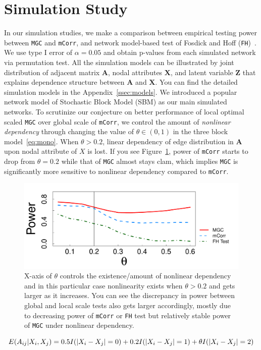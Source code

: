 \documentclass[11pt]{article}
\theoremstyle{definition}
\begin{document}
\section{Simulation Study}
\label{sec:simulation}
	\vspace*{-0.2cm}
In our simulation studies, we make a comparison between empirical testing power between \texttt{MGC} and \texttt{mCorr}, and network model-based test of Fosdick and Hoff (\texttt{FH})~\citep{fosdick2015testing}. We use type I error of $\alpha = 0.05$ and obtain p-values from each simulated network via permutation test. All the simulation models can be illustrated by joint distribution of adjacent matrix $\mathbf{A}$, nodal attributes $\mathbf{X}$, and latent variable $\mathbf{Z}$ that explains dependence structure between $\mathbf{A}$ and $\mathbf{X}$. You can find the detailed simulation models in the Appendix~\ref{ssec:models}. We introduced a popular network model of Stochastic Block Model (SBM) as our main simulated networks. To scrutinize our conjecture on better performance of local optimal scaled \texttt{MGC} over global scale of \texttt{mCorr}, we control the amount of \textit{nonlinear dependency} through changing the value of $\theta \in (0, 1)$ in the three block model~\ref{eq:mono}. When $\theta > 0.2$, linear dependency of edge distribution in $\mathbf{A}$ upon nodal attribute of $X$ is lost. If you see Figure~\ref{fig:powerplot}, power of \texttt{mCorr} starts to drop from $\theta = 0.2$ while that of \texttt{MGC} almost stays clam, which implies \texttt{MGC} is significantly more sensitive to nonlinear dependency compared to \texttt{mCorr}.  
\begin{figure}[ht]
	\centering
	\includegraphics[width=0.7\linewidth]{../Figure/mono_simple.pdf}
	\caption{X-axis of $\theta$ controls the existence/amount of nonlinear dependency and in this particular case nonlinearity exists when $\theta > 0.2$ and gets larger as it increases. You can see the discrepancy in power between global and local scale tests also gets larger accordingly, mostly due to decreasing power of \texttt{mCorr} or \texttt{FH} test but relatively stable power of \texttt{MGC} under nonlinear dependency.}
	\label{fig:powerplot}
\end{figure}
	\vspace*{-0.4cm}
\begin{equation}
E(A_{ij} | X_{i}, X_{j}) = 0.5 I(|X_{i} - X_{j}| = 0) + 0.2 I(|X_{i} - X_{j}| = 1) + \theta I(|X_{i} - X_{j}| = 2)
\label{eq:mono}
	\vspace*{-0.4cm}
\end{equation}
\end{document}
